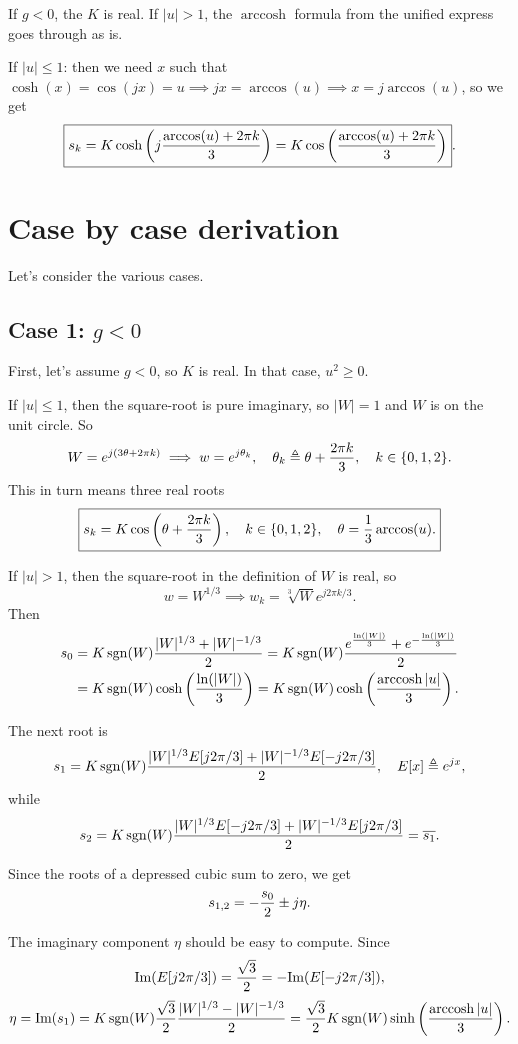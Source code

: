 \documentclass[10pt]{article}
\newcommand{\im}{\text{Im}}
\DeclareMathOperator*{\arccosh}{arccosh}
\DeclareMathOperator*{\sign}{sgn}
\begin{document}
If $g < 0$, the $K$ is real. If $|u|> 1$, the $\arccosh$ formula from the unified express goes through as is.

If $|u| \le 1$: then we need $x$ such that $\cosh(x) = \cos(jx) = u \implies jx = \arccos(u) \implies x = j \arccos(u)$, so we get $$ \boxed{s_k = K \cosh\left(j {\arccos(u) + 2\pi k \over 3} \right) = K \cos\left({\arccos(u) + 2\pi k \over 3} \right) }.$$ 

\section*{Case by case derivation}

Let's consider the various cases.

\subsection*{Case 1: $g<0$}
First, let's assume $g < 0$, so $K$ is real. In that case, $u^2 \ge 0$.

If $|u| \le 1 $, then the square-root is pure imaginary, so $|W| = 1$ and $W$ is on the unit circle. So $$W = e^{j (3 \theta + 2\pi k)} \implies w = e^{j \theta_k}, \quad \theta_k \triangleq \theta + {2 \pi k \over 3}, \quad k \in \{0,1,2\}.$$
This in turn means three real roots $$ \boxed{s_k = K \cos\left(\theta + {2 \pi k \over 3}\right), \quad k \in \{0,1,2\}, \quad \theta = {1 \over 3} \arccos(u).}$$

If $|u| > 1$, then the square-root in the definition of $W$ is real, so $$ w = W^{1/3} \implies w_k = \sqrt[3]{W}e^{j2\pi k/3}.$$ Then
\begin{align*}
  s_0 &= K \sign(W){|W|^{1/3} + |W|^{-1/3} \over 2} = K \sign(W){ e^{{\ln(|W|) \over 3}} + e^{-{\ln(|W|) \over 3}} \over 2}\\
  &= K \sign(W)\cosh\left( {\ln(|W|)\over3} \right) = K \sign(W) \cosh\left({ \arccosh |u| \over 3}\right).
\end{align*}

The next root is $$ s_1 = K\sign(W){|W|^{1/3} E[j 2\pi/3] + |W|^{-1/3}E[-j 2\pi/3] \over 2}, \quad E[x] \triangleq e^{j x},$$
while $$ s_2 = K \sign(W){|W|^{1/3} E[-j2\pi/3] + |W|^{-1/3}E[j 2\pi/3] \over 2} = \overline{s_1}.$$

Since the roots of a depressed cubic sum to zero, we get $$ s_{1,2} = -{s_0 \over 2} \pm j \eta.$$

The imaginary component $\eta$ should be easy to compute. Since $$\im(E[j2\pi/3]) = {\sqrt{3} \over 2}= - \im(E[-j2\pi/3]),$$  $$ \eta = \im(s_1)= K \sign(W) {\sqrt{3} \over 2}{|W|^{1/3} - |W|^{-1/3} \over 2} = { \sqrt{3} \over 2} K \sign(W) \sinh\left({\arccosh|u|} \over 3\right).$$
\end{document}
